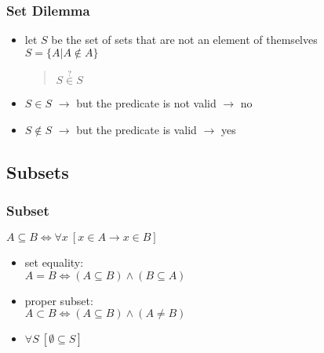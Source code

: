 \documentclass[dvipsnames]{beamer}
\begin{document}
\begin{frame}
  \frametitle{Set Dilemma}

  \begin{itemize}
    \item let $S$ be the set of sets that are not an element of themselves\\
      $S = \{A | A \notin A\}$

    \pause
    \smallskip
    \begin{quote}
      $S \stackrel{?}{\in} S$
    \end{quote}

    \pause
    \item $S \in S$ $\rightarrow$ but the predicate is not valid $\rightarrow$ no

    \pause
    \item $S \notin S$ $\rightarrow$ but the predicate is valid $\rightarrow$ yes
  \end{itemize}
\end{frame}

\subsection{Subsets}

\begin{frame}
  \frametitle{Subset}

  \begin{definition}
    $A \subseteq B \Leftrightarrow \forall x~[x \in A \rightarrow x \in B]$
  \end{definition}

  \pause
  \begin{itemize}
    \item \alert{set equality}:\\
      $A = B \Leftrightarrow (A \subseteq B) \wedge (B \subseteq A)$

    \item \alert{proper subset}:\\
      $A \subset B \Leftrightarrow (A \subseteq B) \wedge (A \neq B)$

    \pause
    \item $\forall S~[\emptyset \subseteq S]$
  \end{itemize}
\end{frame}
\end{document}
